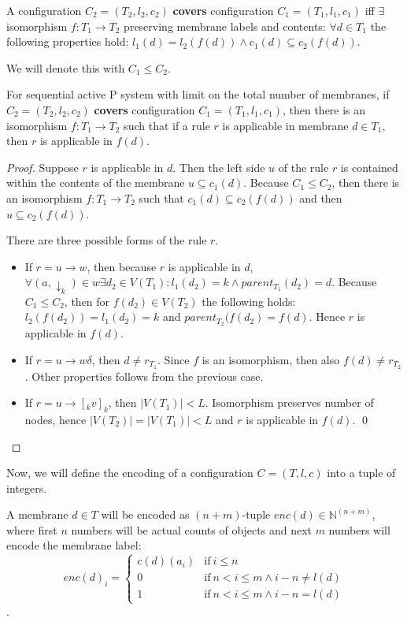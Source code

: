 \documentclass[llncs,submission,copyright,creativecommons]{../lib/lncs/llncs}
\begin{document}
A configuration $C_2 = (T_2, l_2, c_2)$ {\bf covers} configuration $C_1 = (T_1, l_1, c_1)$ iff $\exists$ isomorphism $f: T_1\rightarrow T_2$ preserving membrane labels and contents: $\forall d\in T_1$ the following properties hold: $l_1(d)=l_2(f(d))\wedge c_1(d)\subseteq c_2(f(d))$.

We will denote this with $C_1\leq C_2$.

\begin{lemma}
\label{rule_applicability_lemma}
  For sequential active P system with limit on the total number of membranes, if $C_2 = (T_2, l_2, c_2)$ {\bf covers} configuration $C_1 = (T_1, l_1, c_1)$, then there is an isomorphism $f: T_1\rightarrow T_2$ such that if a rule $r$ is applicable in membrane $d\in T_1$, then $r$ is applicable in $f(d)$.
\end{lemma}

\begin{proof}
  Suppose $r$ is applicable in $d$. Then the left side $u$ of the rule $r$ is contained within the contents of the membrane $u\subseteq c_1(d)$. Because $C_1\leq C_2$, then there is an isomorphism $f:T_1\rightarrow T_2$ such that $c_1(d)\subseteq c_2(f(d))$ and then $u\subseteq c_2(f(d))$.

  There are three possible forms of the rule $r$.
  \begin{itemize}
    \item If $r = u\rightarrow w$, then because $r$ is applicable in $d$, $\forall (a,\downarrow_k)\in w \exists d_2\in V(T_1): l_1(d_2)=k \wedge parent_{T_1}(d_2) = d$. Because $C_1\leq C_2$, then for $f(d_2)\in V(T_2)$ the following holds: $l_2(f(d_2)) = l_1(d_2) = k$ and $parent_{T_2}(f(d_2) = f(d)$. Hence $r$ is applicable in $f(d)$.
    \item If $r = u\rightarrow w\delta$, then $d\neq r_{T_1}$. Since $f$ is an isomorphism, then also $f(d)\neq r_{T_2}$. Other properties follows from the previous case.
    \item If $r = u\rightarrow [_k v]_k$, then $|V(T_1)|<L$. Isomorphism preserves number of nodes, hence $|V(T_2)| = |V(T_1)| < L$ and $r$ is applicable in $f(d)$. \qed
  \end{itemize}
\end{proof}

Now, we will define the encoding of a configuration $C = (T, l, c)$ into a tuple of integers.

A membrane $d\in T$ will be encoded as $(n+m)$-tuple $enc(d)\in\mathbb N^{(n+m)}$, where first $n$ numbers will be actual counts of objects and next $m$ numbers will encode the membrane label:
\[
  enc(d)_{i} =
  \begin{cases}
    c(d)(a_i) & \text{if}\ i\leq n\\
    0 & \text{if}\ n<i\leq m\wedge i-n\neq l(d)\\
    1 & \text{if}\ n<i\leq m\wedge i-n=l(d)
  \end{cases}
\].
\end{document}
